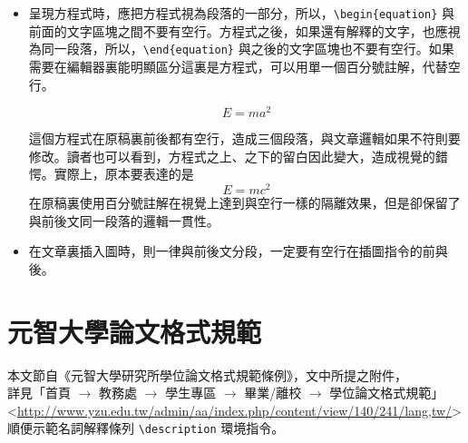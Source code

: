 \begin{itemize}
	\item 呈現方程式時，應把方程式視為段落的一部分，所以，\verb+\begin{equation}+ 與前面的文字區塊之間不要有空行。方程式之後，如果還有解釋的文字，也應視為同一段落，所以，\verb+\end{equation}+ 與之後的文字區塊也不要有空行。如果需要在編輯器裏能明顯區分這裏是方程式，可以用單一個百分號註解，代替空行。
	
		\begin{equation}
		E = ma^2
		\label{eq:ma2}
		\end{equation}
		
	這個方程式在原稿裏前後都有空行，造成三個段落，與文章邏輯如果不符則要修改。讀者也可以看到，方程式之上、之下的留白因此變大，造成視覺的錯愕。實際上，原本要表達的是
%
		\begin{equation}
		E = mc^2
		\label{eq:mc2}
		\end{equation}
%
在原稿裏使用百分號註解在視覺上達到與空行一樣的隔離效果，但是卻保留了與前後文同一段落的邏輯一貫性。

	\item 在文章裏插入圖時，則一律與前後文分段，一定要有空行在插圖指令的前與後。
	\end{itemize}


\chapter{元智大學論文格式規範}
本文節自《元智大學研究所學位論文格式規範條例》，文中所提之附件，\\
詳見「首頁 $\rightarrow$ 教務處 $\rightarrow$ 學生專區 $\rightarrow$ 畢業/離校 $\rightarrow$ 學位論文格式規範」\\
\textless\url{http://www.yzu.edu.tw/admin/aa/index.php/content/view/140/241/lang,tw/}\textgreater\\
順便示範名詞解釋條列 \verb+\description+ 環境指令。

